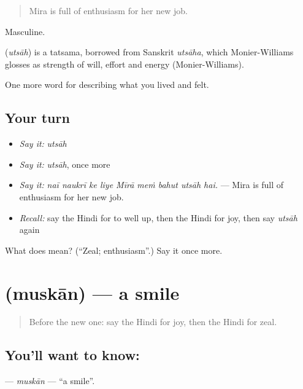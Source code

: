 \begin{quote}
Mira is full of enthusiasm for her new job.
\end{quote}

Masculine.

\begin{cousinweb}
\textbf{} (\emph{utsāh}) is a tatsama, borrowed from Sanskrit \emph{utsāha}, which Monier-Williams glosses as strength of will, effort and energy (Monier-Williams).
\end{cousinweb}

\begin{grammarlens}[title={What you've built}]
One more word for describing what you lived and felt.
\end{grammarlens}

\subsection*{Your turn}
\begin{itemize}
\raggedright
  \item \emph{Say it:} \emph{utsāh}
  \item \emph{Say it:} \emph{utsāh}, once more
  \item \emph{Say it:} \emph{naī naukrī ke liye Mīrā meṁ bahut utsāh hai.} — Mira is full of enthusiasm for her new job.
  \item \emph{Recall:} say the Hindi for to well up, then the Hindi for joy, then say \emph{utsāh} again
\end{itemize}

\begin{tcolorbox}[breakable,colback=teal!4,colframe=teal!35!black,title={Before you move on}]
What does  mean? (\textquotedblleft{}Zeal; enthusiasm\textquotedblright{}.) Say it once more.
\end{tcolorbox}
\section[\texorpdfstring{\hi{मुस्कान} (muskān)}{मुस्कान (muskān)}]{ (muskān) — a smile}

\label{lesson:HI-C453-muskan}



\begin{quote}
Before the new one: say the Hindi for joy, then the Hindi for zeal.
\end{quote}

\subsection*{You'll want to know: }
\textbf{} — \emph{muskān} — \textquotedblleft{}a smile\textquotedblright{}.

